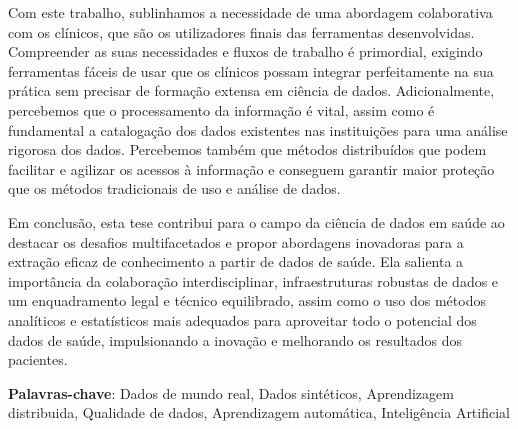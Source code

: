 Com este trabalho, sublinhamos a necessidade de uma abordagem colaborativa com os clínicos, que são os utilizadores finais das ferramentas desenvolvidas. Compreender as suas necessidades e fluxos de trabalho é primordial, exigindo ferramentas fáceis de usar que os clínicos possam integrar perfeitamente na sua prática sem precisar de formação extensa em ciência de dados. Adicionalmente, percebemos que o processamento da informação é vital, assim como é fundamental a catalogação dos dados existentes nas instituições para uma análise rigorosa dos dados. Percebemos também que métodos distribuídos que podem facilitar e agilizar os acessos à informação e conseguem garantir maior proteção que os métodos tradicionais de uso e análise de dados.

Em conclusão, esta tese contribui para o campo da ciência de dados em saúde ao destacar os desafios multifacetados e propor abordagens inovadoras para a extração eficaz de conhecimento a partir de dados de saúde. Ela salienta a importância da colaboração interdisciplinar, infraestruturas robustas de dados e um enquadramento legal e técnico equilibrado, assim como o uso dos métodos analíticos e estatísticos mais adequados para aproveitar todo o potencial dos dados de saúde, impulsionando a inovação e melhorando os resultados dos pacientes.

\vspace*{10mm}\noindent
\textbf{Palavras-chave}: Dados de mundo real, Dados sintéticos, Aprendizagem distribuida, Qualidade de dados, Aprendizagem automática, Inteligência Artificial

